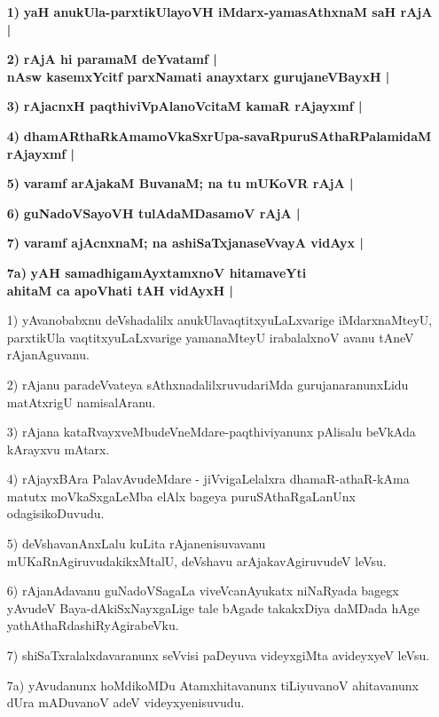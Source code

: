 \begin{itemize}
\item [\bf 1)] {\bf yaH anukUla-parxtikUlayoVH iMdarx-yamasAthxnaM saH rAjA |}\label{94}
\item [\bf 2)] {\bf rAjA hi paramaM deYvatamf |\\\label{93b} nAsw kasemxYcitf parxNamati anayxtarx gurujaneVBayxH |}
\item [\bf 3)] {\bf rAjacnxH paqthiviVpAlanoVcitaM kamaR rAjayxmf |}\label{94a}
\item [\bf 4)] {\bf dhamARthaRkAmamoVkaSxrUpa-savaRpuruSAthaRPalamidaM rAjayxmf |}\label{94b}
\item [\bf 5)] {\bf varamf arAjakaM BuvanaM; na tu mUKoVR rAjA |}\label{94c}
\item [\bf 6)] {\bf guNadoVSayoVH tulAdaMDasamoV rAjA |}\label{94d}
\item [\bf 7)] {\bf varamf ajAcnxnaM; na ashiSaTxjanaseVvayA vidAyx |}\label{94e}
\item [\bf 7a)] {\bf yAH samadhigamAyxtamxnoV hitamaveYti}\\ {\bf ahitaM ca apoVhati tAH vidAyxH |}\label{94f}

\item [1)] yAvanobabxnu deVshadalilx anukUlavaqtitxyuLaLxvarige iMdarxnaMteyU, parxtikUla vaqtitxyuLaLxvarige yamanaMteyU irabalalxnoV avanu tAneV rAjanAguvanu.
\item [2)] rAjanu paradeVvateya sAthxnadalilxruvudariMda gurujanaranunxLidu matAtxrigU namisalAranu.
\item [3)] rAjana kataRvayxveMbudeVneMdare-paqthiviyanunx pAlisalu beVkAda kArayxvu mAtarx.
\item [4)] rAjayxBAra PalavAvudeMdare - jiVvigaLelalxra dhamaR-athaR-kAma matutx moVkaSxgaLeMba elAlx bageya puruSAthaRgaLanUnx odagisikoDuvudu.
\item [5)] deVshavanAnxLalu kuLita rAjanenisuvavanu mUKaRnAgiruvudakikxMtalU, deVshavu arAjakavAgiruvudeV leVsu.
\item [6)] rAjanAdavanu guNadoVSagaLa viveVcanAyukatx niNaRyada bagegx yAvudeV Baya-dAkiSxNayxgaLige tale bAgade takakxDiya daMDada hAge yathAthaRdashiRyAgirabeVku.
\item [7)] shiSaTxralalxdavaranunx seVvisi paDeyuva videyxgiMta avideyxyeV leVsu.
\item [7a)] yAvudanunx hoMdikoMDu Atamxhitavanunx tiLiyuvanoV ahitavanunx dUra mADuvanoV adeV videyxyenisuvudu.


\end{itemize}
